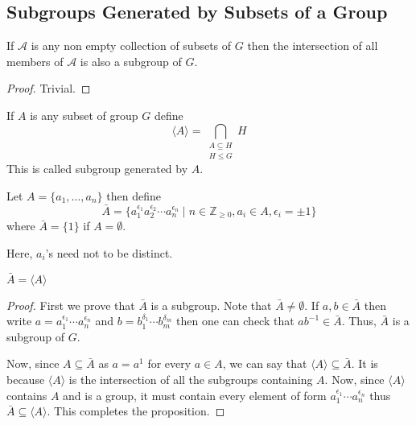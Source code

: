 \subsection{Subgroups Generated by Subsets of a Group}

\begin{proposition}
    If $\mathcal{A}$ is any non empty collection of subsets of $G$ then the intersection of all members of $\mathcal{A}$ is also a 
    subgroup of $G$. 
\end{proposition}

\begin{proof}
    Trivial.
\end{proof}

\begin{definition}
    If $A$ is any subset of group $G$ define
    \[ \langle A \rangle = \bigcap_{\substack{A \subseteq H \\ H \le G}} H \]
    This is called subgroup generated by $A$.
\end{definition}

\begin{definition}
    Let $A=\{a_1,\ldots,a_n\}$ then define
    \[ \bar{A} = \{a_1^{\epsilon_1} a_2^{\epsilon_2} \cdots a_n^{\epsilon_n} \mid n \in \mathbb{Z}_{\ge 0}, a_i \in A, \epsilon_{i}=\pm1 \} \]
    where $\bar{A}=\{1\}$ if $A= \emptyset$.
\end{definition}

\begin{remark}
    Here, $a_i$'s need not to be distinct.
\end{remark}

\begin{proposition}
    $\bar{A}=\langle A \rangle$
\end{proposition}

\begin{proof}
    First we prove that $\bar{A}$ is a subgroup. Note that $\bar{A}\neq \emptyset$. If $a, b  \in \bar{A}$ then write 
    $a=a_1^{\epsilon_1} \cdots a_n^{\epsilon_n}$ and $b=b_1^{\delta_1} \cdots b_m^{\delta_m}$ then one can check that $ab^{-1} \in \bar{A}$.
    Thus, $\bar{A}$ is a subgroup of $G$.
    
    Now, since $A \subseteq \bar{A}$ as $a = a^1$ for every $a \in A$, we can say that $\langle A \rangle \subseteq \bar{A}$. It is because
    $\langle A \rangle$ is the intersection of all the subgroups containing $A$. Now, since $\langle A \rangle$ contains $A$ and is a group,
    it must contain every element of form $a_1^{\epsilon_1} \cdots a_n^{\epsilon_n}$ thus $\bar{A} \subseteq \langle A \rangle$. This
    completes the proposition.
\end{proof}

